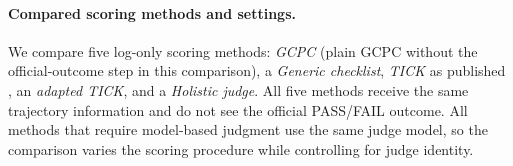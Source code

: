 \documentclass[sigconf,nonacm]{acmart}
\begin{document}




\paragraph{Compared scoring methods and settings.}
We compare five log-only scoring methods: \emph{GCPC} (plain GCPC without the official-outcome step in this comparison), a \emph{Generic checklist}, \emph{TICK} as published \citep{cook2024tick}, an \emph{adapted TICK}, and a \emph{Holistic judge}. All five methods receive the same trajectory information and do not see the official PASS/FAIL outcome. All methods that require model-based judgment use the same judge model, so the comparison varies the scoring procedure while controlling for judge identity.
\end{document}
